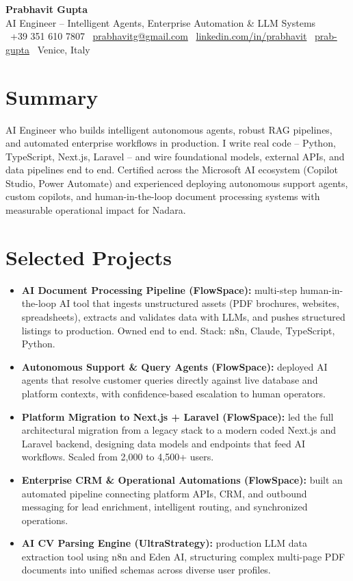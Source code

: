 \documentclass[a4paper,10pt]{article}
\begin{document}
\begin{center}
 {\Huge\bfseries Prabhavit Gupta}\\[3pt]
 {\color{accent}\large AI Engineer -- Intelligent Agents, Enterprise Automation \& LLM Systems}\\[5pt]
 \faPhone\ +39 351 610 7807 \quad
 \faEnvelope\ \href{mailto:prabhavitg@gmail.com}{prabhavitg@gmail.com} \quad
 \faLinkedin\ \href{https://www.linkedin.com/in/prabhavit/}{linkedin.com/in/prabhavit} \quad
 \faGithub\ \href{https://github.com/prab-gupta}{prab-gupta} \quad
 \faMapMarker*\ Venice, Italy
\end{center}

\section{Summary}
AI Engineer who builds intelligent autonomous agents, robust RAG pipelines, and automated enterprise workflows in production. I write real code -- Python, TypeScript, Next.js, Laravel -- and wire foundational models, external APIs, and data pipelines end to end. Certified across the Microsoft AI ecosystem (Copilot Studio, Power Automate) and experienced deploying autonomous support agents, custom copilots, and human-in-the-loop document processing systems with measurable operational impact for Nadara.

\section{Selected Projects}
\begin{itemize}
 \item \textbf{AI Document Processing Pipeline (FlowSpace):} multi-step human-in-the-loop AI tool that ingests unstructured assets (PDF brochures, websites, spreadsheets), extracts and validates data with LLMs, and pushes structured listings to production. Owned end to end. Stack: n8n, Claude, TypeScript, Python.
 \item \textbf{Autonomous Support \& Query Agents (FlowSpace):} deployed AI agents that resolve customer queries directly against live database and platform contexts, with confidence-based escalation to human operators.
 \item \textbf{Platform Migration to Next.js + Laravel (FlowSpace):} led the full architectural migration from a legacy stack to a modern coded Next.js and Laravel backend, designing data models and endpoints that feed AI workflows. Scaled from 2,000 to 4,500+ users.
 \item \textbf{Enterprise CRM \& Operational Automations (FlowSpace):} built an automated pipeline connecting platform APIs, CRM, and outbound messaging for lead enrichment, intelligent routing, and synchronized operations.
 \item \textbf{AI CV Parsing Engine (UltraStrategy):} production LLM data extraction tool using n8n and Eden AI, structuring complex multi-page PDF documents into unified schemas across diverse user profiles.
\end{itemize}
\end{document}
